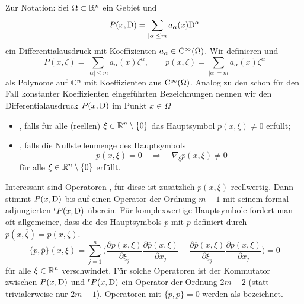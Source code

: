 Zur Notation: Sei $\Omega\subset\mathbb R^n$ ein Gebiet und 
\begin{equation}
   P(x,\mathrm D) = \sum_{|\alpha|\le m} a_\alpha(x) \mathrm D^\alpha
\end{equation}
ein Differentialausdruck mit Koeffizienten $a_\alpha\in\mathrm C^\infty(\Omega)$. Wir definieren  und 
\begin{equation}
   P(x,\zeta) = \sum_{|\alpha|\le m} a_\alpha(x)\zeta^\alpha,\qquad p(x,\zeta)=\sum_{|\alpha|=m} a_\alpha(x)\zeta^\alpha
\end{equation}
als Polynome auf $\mathbb C^n$ mit Koeffizienten aus $\mathrm C^\infty(\Omega)$. Analog zu den schon für den Fall konstanter Koeffizienten eingeführten Bezeichnungen nennen wir den Differentialausdruck $P(x,\mathrm D)$ im Punkt $x\in\Omega$
\begin{itemize}
\item {}, falls für alle (reellen) $\xi\in\mathbb R^n\setminus\{0\}$ das Hauptsymbol $p(x,\xi)\ne0$ erfüllt;
\item {}, falls die Nullstellenmenge des Hauptsymbols 
\begin{equation}
    p(x,\xi) = 0 \quad \Longrightarrow \quad \nabla_\xi p(x,\xi)\ne0
\end{equation}
für alle $\xi\in\mathbb R^n\setminus\{0\}$ erfüllt.
\end{itemize}
Interessant sind Operatoren , für diese ist zusätzlich $p(x,\xi)$ reellwertig. Dann stimmt $P(x,\mathrm D)$ bis auf einen Operator der Ordnung $m-1$ mit seinem formal adjungierten ${}^t{P}(x,\mathrm D)$ \"uberein. Für komplexwertige Hauptsymbole fordert man oft allgemeiner, dass
die  des Hauptsymbols $p$ mit $\overline p$ definiert durch $\overline p(x, \overline\zeta) = \overline{p(x,\zeta)}$.
\begin{equation}
    \{ p,\overline p\} (x,\xi) = \sum_{j=1}^n \bigg(\frac{\partial p(x,\xi)}{\partial \xi_j} \frac{\partial \overline p (x,\xi)}{\partial x_j} - \frac{\partial \overline p(x,\xi)}{\partial \xi_j}\frac{\partial  p(x,\xi)}{\partial x_j} \bigg)    = 0 
\end{equation}
für alle $\xi\in\mathbb R^n$ verschwindet. Für solche Operatoren ist der Kommutator zwischen $P(x,\mathrm D)$ und ${}^t P(x,\mathrm D)$ ein Operator der Ordnung $2m-2$ (statt trivialerweise nur $2m-1$). Operatoren mit $\{p,\overline p\}=0$ werden als  bezeichnet.


